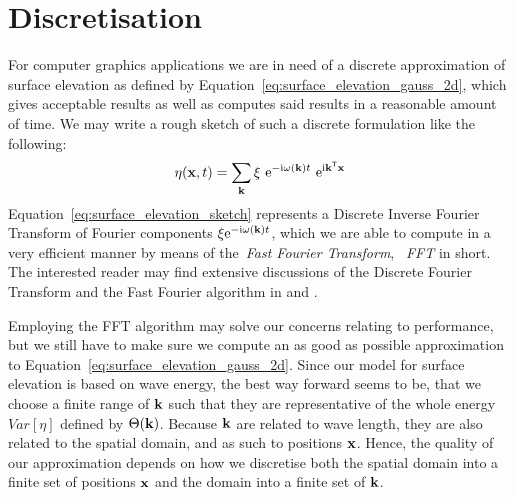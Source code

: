 \section{Discretisation}
\label{sec:random_sea_discretisation}
For computer graphics applications we are in need of a discrete approximation 
of surface elevation as defined by 
Equation~\ref{eq:surface_elevation_gauss_2d}, 
which gives acceptable results as well as computes said results in a reasonable 
amount of time. We may write a rough sketch of such a discrete formulation like 
the following:
\begin{equation}
\label{eq:surface_elevation_sketch}
 \eta(\mathbf{x}, t) = \sum_{\mathbf{k}} 
\xi~\mathrm{e}^{-\mathrm{i}\omega(\mathbf{k}) t}
~\mathrm{e}^{\mathrm{i}\mathbf{k}^{\mathsf{T}}\mathbf{x}}
\end{equation}
Equation~\ref{eq:surface_elevation_sketch} represents a Discrete Inverse 
Fourier Transform of Fourier components 
$\xi\mathrm{e}^{-\mathrm{i}\omega(\mathbf{k}) t}$, which we are able to compute in 
a very efficient manner by means of the~\emph{Fast Fourier Transform}, 
~\emph{FFT} in short. The interested reader may find extensive discussions of 
the Discrete Fourier Transform and the Fast Fourier algorithm
in \cite{book:bracewell2000fourier} and \cite{book:numericalrecipes}.

Employing the FFT algorithm may solve our concerns relating to performance, but 
we still have to make sure we compute an as good as possible approximation to 
Equation~\ref{eq:surface_elevation_gauss_2d}. Since our model for surface 
elevation is based on wave energy, the best way forward seems to be, that we 
choose a finite range of \wavevectors $\mathbf{k}$ such that they are 
representative of the whole energy $Var[\eta]$ defined by $\Theta(\mathbf{k})$. 
Because \wavevectors $\mathbf{k}$ are related to wave length, they are also 
related to the spatial domain, and as such to positions $\mathbf{x}$. Hence, the 
quality of our approximation depends on how we discretise both the spatial 
domain into a finite set of positions $\mathbf{x}$ and the \wavevector domain 
into a finite set of \wavevectors $\mathbf{k}$.
%
